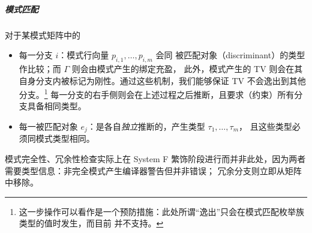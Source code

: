 \subparagraph*{模式匹配} 对于某模式矩阵中的
\vspace{-.8em}
\begin{itemize}\itemsep-.5em
  \item 每一分支 \(i\)：模式行向量 \(p_{i,1}, \ldots, p_{i,m}\) 会同
    被匹配对象（discriminant）的类型作比较；而 $\Gamma$ 则会由模式产生的绑定充盈，
    此外，模式产生的 TV 则会在其自身分支内被标记为刚性。通过这些机制，我们能够保证 TV 不会逸出到其他分支。\footnote{
      这一步操作可以看作是一个预防措施：此处所谓“逸出”只会在模式匹配枚举族类型的值时发生，而目前 \Tigris 并不支持。
    }
    每一分支的右手侧则会在上述过程之后推断，且要求（约束）所有分支具备相同类型。
  \item 每一被匹配对象 \(e_j\)：是各自\emph{独立}推断的，产生类型 \(\tau_1, \ldots, \tau_m\)，
    且这些类型必须同模式类型相同。
\end{itemize}
模式完全性、冗余性检查实际上在 System F 繁饰阶段进行而并非此处，因为两者需要类型信息：非完全模式产生编译器警告但并非错误；
冗余分支则立即从矩阵中移除。
{\allowdisplaybreaks
}
\vspace{-1em}
